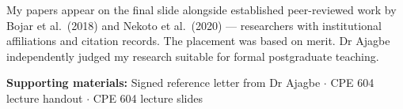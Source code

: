 \documentclass[11pt,a4paper]{article}
\begin{document}
My papers appear on the final slide alongside established peer-reviewed work by Bojar et al.\ (2018) and Nekoto et al.\ (2020) --- researchers with institutional affiliations and citation records. The placement was based on merit. Dr Ajagbe independently judged my research suitable for formal postgraduate teaching.

\medskip
\noindent\textbf{Supporting materials:} Signed reference letter from Dr Ajagbe $\cdot$ CPE 604 lecture handout $\cdot$ CPE 604 lecture slides
\end{document}
